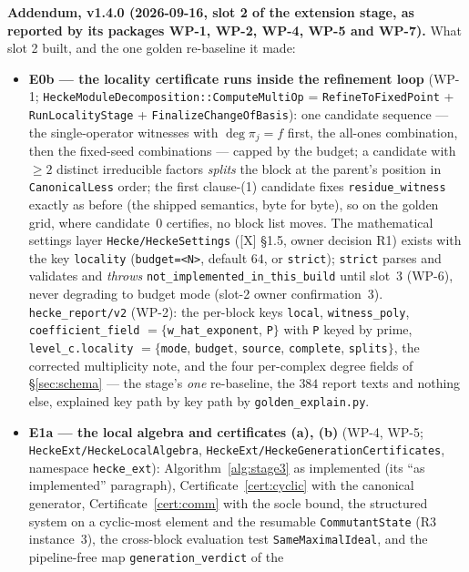 \documentclass[11pt]{article}
\theoremstyle{remark}
\begin{document}
\noindent\textbf{Addendum, v1.4.0 (2026-09-16, slot 2 of the extension stage, as reported by its
packages WP-1, WP-2, WP-4, WP-5 and WP-7).} What slot 2 built, and the one golden re-baseline
it made:
\begin{itemize}
\item \textbf{E0b --- the locality certificate runs inside the refinement loop} (WP-1;
  \texttt{HeckeModuleDecomposition::ComputeMultiOp} = \texttt{RefineToFixedPoint} +
  \texttt{RunLocalityStage} + \texttt{FinalizeChangeOfBasis}): one candidate sequence --- the
  single-operator witnesses with $\deg\pi_j=f$ first, the all-ones combination, then the
  fixed-seed combinations --- capped by the budget; a candidate with $\ge2$ distinct irreducible
  factors \emph{splits} the block at the parent's position in \texttt{CanonicalLess} order; the
  first clause-(1) candidate fixes \texttt{residue\_witness} exactly as before (the shipped
  semantics, byte for byte), so on the golden grid, where candidate~$0$ certifies, no block list
  moves. The mathematical settings layer \texttt{Hecke/HeckeSettings} ([X] \S1.5, owner decision
  R1) exists with the key \texttt{locality} (\texttt{budget=<N>}, default $64$, or
  \texttt{strict}); \texttt{strict} parses and validates and \emph{throws}
  \texttt{not\_implemented\_in\_this\_build} until slot~3 (WP-6), never degrading to budget mode
  (slot-2 owner confirmation~3). \texttt{hecke\_report/v2} (WP-2): the per-block keys
  \texttt{local}, \texttt{witness\_poly}, \texttt{coefficient\_field} $=\{$\texttt{w\_hat\_exponent},
  \texttt{P}$\}$ with \texttt{P} keyed by prime, \texttt{level\_c.locality} $=\{$\texttt{mode},
  \texttt{budget}, \texttt{source}, \texttt{complete}, \texttt{splits}$\}$, the corrected
  multiplicity note, and the four per-complex degree fields of \S\ref{sec:schema} --- the stage's
  \emph{one} re-baseline, the $384$ report texts and nothing else, explained key path by key path
  by \texttt{golden\_explain.py}.
\item \textbf{E1a --- the local algebra and certificates (a), (b)} (WP-4, WP-5;
  \texttt{HeckeExt/HeckeLocalAlgebra}, \texttt{HeckeExt/HeckeGenerationCertificates}, namespace
  \texttt{hecke\_ext}): Algorithm~\ref{alg:stage3} as implemented (its ``as implemented''
  paragraph), Certificate~\ref{cert:cyclic} with the canonical generator,
  Certificate~\ref{cert:comm} with the socle bound, the structured system on a cyclic-most
  element and the resumable \texttt{CommutantState} (R3 instance~3), the cross-block evaluation
  test \texttt{SameMaximalIdeal}, and the pipeline-free map \texttt{generation\_verdict} of the

\end{itemize}
\end{document}
